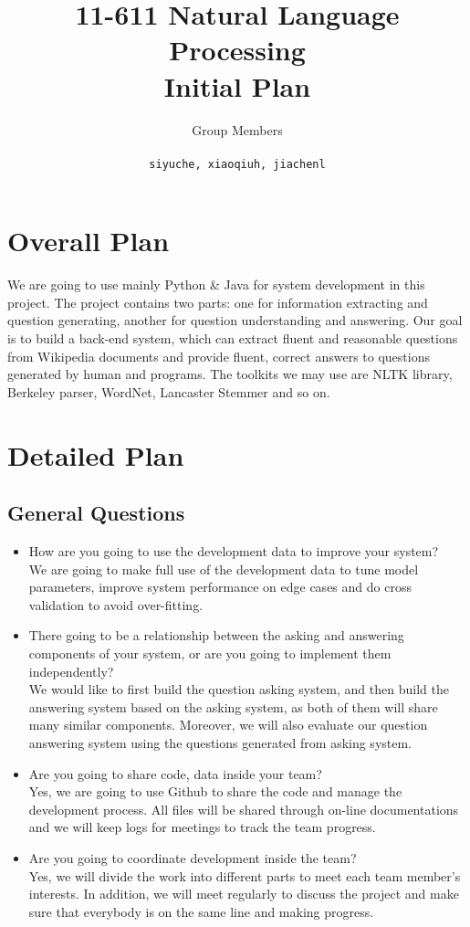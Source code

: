 \documentclass[a4page]{article}
\author{Group Members \\ \text{Siyu Chen, Xiaoqiu Huang, Jiachen Li} \\ \texttt{siyuche, xiaoqiuh, jiachenl}
}
\title{11-611 Natural Language Processing \\ Initial Plan}
\date{}
\begin{document}
\maketitle


\section{Overall Plan}
We are going to use mainly Python \& Java for system development in this project. The project contains two parts: one for information extracting and question generating, another for question understanding and answering.
Our goal is to build a back-end system, which can extract fluent and reasonable questions from Wikipedia documents and provide fluent, correct answers to questions generated by human and programs.
The toolkits we may use are NLTK library, Berkeley parser, WordNet, Lancaster Stemmer and so on.

\section{Detailed Plan}
\subsection{General Questions}
\begin{itemize}
\item How are you going to use the development data to improve your system?
\\We are going to make full use of the development data to tune model parameters, improve system performance on edge cases and do cross validation to avoid over-fitting.

\item There going to be a relationship between the asking and answering components of your system, or are you going to implement them independently?\\
We would like to first build the question asking system, and then build the answering system based on the asking system, as both of them will share many similar components. Moreover, we will also evaluate our question answering system using the questions generated from asking system.

\item Are you going to share code, data inside your team?
\\Yes, we are going to use Github to share the code and manage the development process. All files will be shared through on-line documentations and we will keep logs for meetings to track the team progress.

\item Are you going to coordinate development inside the team? \\
Yes, we will divide the work into different parts to meet each team member's interests. In addition, we will meet regularly to discuss the project and make sure that everybody is on the same line and making progress.

\end{itemize}
\end{document}
